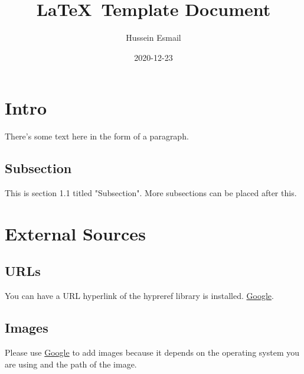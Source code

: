 \documentclass[article,oneside]{memoir}
\title {\LaTeX\ Template Document}
\author{Hussein Esmail}
\date{2020-12-23}
\begin{document}
\maketitle

\chapter{Intro}

There's some text here in the form of a paragraph.

\section{Subsection}
This is section 1.1 titled "Subsection". More subsections can be placed after this.

\chapter{External Sources}
\section{URLs}
You can have a URL hyperlink of the hypreref library is installed. \href{https://google.com}{Google}.
\section{Images}
Please use \href{https://google.com}{Google} to add images because it depends on the operating system you are using and the path of the image.
\end{document}
